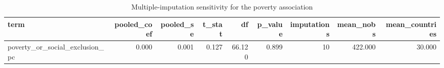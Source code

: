 \begin{table}
\caption{Multiple-imputation sensitivity for the poverty association}
\label{tab:multiple_imputation_sensitivity}
\begin{tabular}{lrrrrrrrr}
\toprule
term & pooled\_coef & pooled\_se & t\_stat & df & p\_value & imputations & mean\_nobs & mean\_countries \\
\midrule
poverty\_or\_social\_exclusion\_pc & 0.000 & 0.001 & 0.127 & 66.120 & 0.899 & 10 & 422.000 & 30.000 \\
\bottomrule
\end{tabular}
\end{table}
